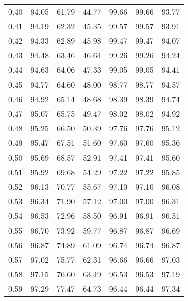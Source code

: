 \begin{tabular}{|c|c|c|c|c|c|c|}
      0.40 &     94.05 &     61.79 &      44.77 &   99.66 &      99.66 &         93.77 \\
      0.41 &     94.19 &     62.32 &      45.35 &   99.57 &      99.57 &         93.91 \\
      0.42 &     94.33 &     62.89 &      45.98 &   99.47 &      99.47 &         94.07 \\
      0.43 &     94.48 &     63.46 &      46.64 &   99.26 &      99.26 &         94.24 \\
      0.44 &     94.63 &     64.06 &      47.33 &   99.05 &      99.05 &         94.41 \\
      0.45 &     94.77 &     64.60 &      48.00 &   98.77 &      98.77 &         94.57 \\
      0.46 &     94.92 &     65.14 &      48.68 &   98.39 &      98.39 &         94.74 \\
      0.47 &     95.07 &     65.75 &      49.47 &   98.02 &      98.02 &         94.92 \\
      0.48 &     95.25 &     66.50 &      50.39 &   97.76 &      97.76 &         95.12 \\
      0.49 &     95.47 &     67.51 &      51.60 &   97.60 &      97.60 &         95.36 \\
      0.50 &     95.69 &     68.57 &      52.91 &   97.41 &      97.41 &         95.60 \\
      0.51 &     95.92 &     69.68 &      54.29 &   97.22 &      97.22 &         95.85 \\
      0.52 &     96.13 &     70.77 &      55.67 &   97.10 &      97.10 &         96.08 \\
      0.53 &     96.34 &     71.90 &      57.12 &   97.00 &      97.00 &         96.31 \\
      0.54 &     96.53 &     72.96 &      58.50 &   96.91 &      96.91 &         96.51 \\
      0.55 &     96.70 &     73.92 &      59.77 &   96.87 &      96.87 &         96.69 \\
      0.56 &     96.87 &     74.89 &      61.09 &   96.74 &      96.74 &         96.87 \\
      0.57 &     97.02 &     75.77 &      62.31 &   96.66 &      96.66 &         97.03 \\
      0.58 &     97.15 &     76.60 &      63.49 &   96.53 &      96.53 &         97.19 \\
      0.59 &     97.29 &     77.47 &      64.73 &   96.44 &      96.44 &         97.34 \\

\end{tabular}

